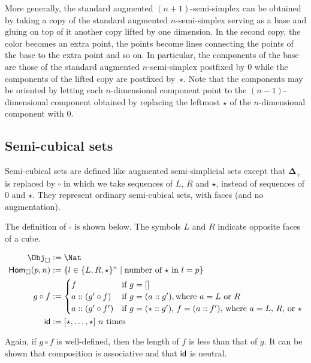 \documentclass{msc}
\newcommand{\DeltaPlus}{\ensuremath{\boldsymbol{\Delta}_+}}
\newcommand{\Cube}{\ensuremath{\boldsymbol{{\square}}}}
\newcommand{\kstar}{{\star}}
\begin{document}
More generally, the standard augmented $(n + 1)$-semi-simplex can be obtained by taking a copy of the standard augmented $n$-semi-simplex serving as a base and gluing on top of it another copy lifted by one dimension. In the second copy, the color becomes an extra point, the points become lines connecting the points of the base to the extra point and so on. In particular, the components of the base are those of the standard augmented $n$-semi-simplex postfixed by $0$ while the components of the lifted copy are postfixed by~$\kstar$. Note that the components may be oriented by letting each $n$-dimensional component point to the $(n-1)$-dimensional component obtained by replacing the leftmost $\kstar$ of the $n$-dimensional component with $0$.

\subsection*{Semi-cubical sets}
Semi-cubical sets are defined like augmented semi-simplicial sets except that $\DeltaPlus$ is replaced by $\Cube$ in which we take sequences of $L$, $R$ and $\star$, instead of sequences of $0$ and $\kstar$. They represent ordinary semi-cubical sets, with faces (and no augmentation).

\begin{definition}[\Cube]
  The definition of $\Cube$ is shown below. The symbols $L$ and $R$ indicate opposite faces of a cube.

  \begin{align*}
    \Obj_{\Cube}       & := \Nat                                                                          \\
    \Hom_{\Cube}(p, n) & := \{l \in \{L, R, \kstar\}^n \mid \text{number of $\kstar$ in $l = p$}\}        \\
    g \circ f          & :=
    \begin{cases}
      f                  & \text{if $g = []$}                                                               \\
      a :: (g' \circ f)  & \text{if $g = (a :: g')$}, \text{where $a = L$ or $R$}                           \\
      a :: (g' \circ f') & \text{if $g = (\kstar :: g')$, $f = (a :: f')$, where $a = L$, $R$, or $\kstar$} \\
    \end{cases} \\
    \id                & := [\kstar, \ldots, \kstar] \text{ $n$ times}
  \end{align*}

  Again, if $g \circ f$ is well-defined, then the length of $f$ is less than that of $g$. It can be shown that composition is associative and that $\mathsf{id}$ is neutral.
\end{definition}
\end{document}
